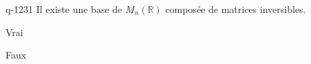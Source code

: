 \begin{truefalse}{q-1231}
Il existe une base de $M_n(\mathbb{R})$ composée de matrices inversibles.
\item* Vrai
\item Faux
\end{truefalse}

